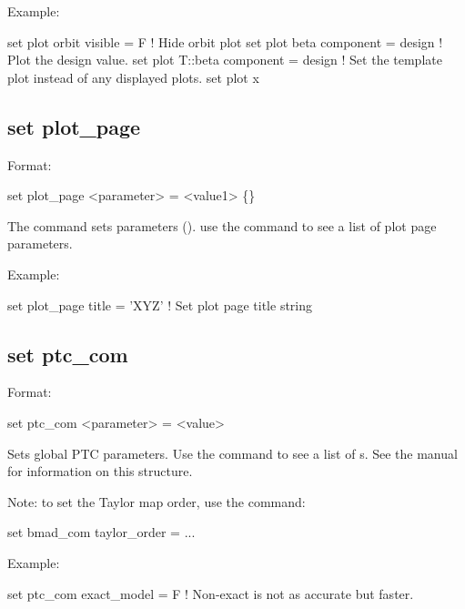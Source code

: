 {{{{{Example:
\begin{example}
  set plot orbit visible = F           ! Hide orbit plot
  set plot beta component = design     ! Plot the design value.
  set plot T::beta component = design  ! Set the template plot instead of any displayed plots.
  set plot x%
\end{example}


\subsection{set plot\_page}
\label{s:set.plot.page}

Format:
\begin{example}
  set plot_page <parameter> = <value1> \{<value2>\}
\end{example}

The  command sets  parameters ().
use the  command to see a list of plot page parameters.

Example:
\begin{example}
  set plot_page title = 'XYZ'  ! Set plot page title string
\end{example}


\subsection{set ptc_com}
\label{s:set.ptc.com}

Format:
\begin{example}
  set ptc_com <parameter> = <value>
\end{example}

Sets global PTC parameters. Use the  command to see a list of
s. See the \bmad manual for information on this structure.

Note: to set the Taylor map order, use the command:
\begin{example}
  set bmad_com taylor_order = ...
\end{example}

Example:
\begin{example}
  set ptc_com exact_model = F ! Non-exact is not as accurate but faster.
\end{example}

}}}}}

